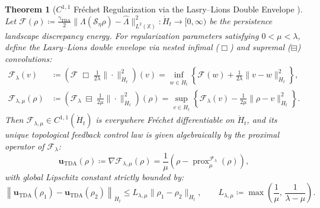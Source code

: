 \documentclass[11pt,a4paper,reqno]{article}
\theoremstyle{plain}
\newtheorem{theorem}{Theorem}[section]
\theoremstyle{definition}
\theoremstyle{remark}
\numberwithin{equation}{section}
\begin{document}
\begin{theorem}[$C^{1,1}$ Fr\'echet Regularization via the Lasry--Lions Double Envelope \cite{lasry1986remarks, attouch1993approximation, ananda2026stochastic_fluid_v2}]\label{thm:lasry_lions}
Let $\mathcal{F}(\rho) \coloneqq \frac{\gamma_{\mathrm{TDA}}}{2}\|\Lambda(\mathcal{S}_\eta\rho) - \hat{\Lambda}\|_{L^2(\mathbb{X})}^2 : \dot{H}_t \to [0, \infty)$ be the persistence landscape discrepancy energy. For regularization parameters satisfying $0 < \mu < \lambda$, define the Lasry--Lions double envelope via nested infimal ($\Box$) and supremal ($\boxminus$) convolutions:
\begin{align}
  \label{eq:lasry_lions_inf}
  \mathcal{F}_\lambda(v) &\coloneqq \left(\mathcal{F} \;\Box\; \frac{1}{2\lambda}\|\cdot\|_{\dot{H}_t}^2\right)(v) = \inf_{w \in \dot{H}_t} \left\{ \mathcal{F}(w) + \frac{1}{2\lambda}\|v - w\|_{\dot{H}_t}^2 \right\}, \\
  \label{eq:lasry_lions_def}
  \mathcal{F}_{\lambda,\mu}(\rho) &\coloneqq \left(\mathcal{F}_\lambda \;\boxminus\; \frac{1}{2\mu}\|\cdot\|_{\dot{H}_t}^2\right)(\rho) = \sup_{v \in \dot{H}_t} \left\{ \mathcal{F}_\lambda(v) - \frac{1}{2\mu}\|\rho - v\|_{\dot{H}_t}^2 \right\}.
\end{align}
Then $\mathcal{F}_{\lambda,\mu} \in C^{1,1}(\dot{H}_t)$ is everywhere Fr\'echet differentiable on $\dot{H}_t$, and its unique topological feedback control law is given algebraically by the proximal operator of $\mathcal{F}_\lambda$:
\begin{equation}\label{eq:lasry_lions_grad}
  \mathbf{u}_{\mathrm{TDA}}(\rho) \coloneqq \nabla \mathcal{F}_{\lambda,\mu}(\rho) = \frac{1}{\mu}\left( \rho - \operatorname{prox}_{\mu}^{\mathcal{F}_\lambda}(\rho) \right),
\end{equation}
with global Lipschitz constant strictly bounded by:
\begin{equation}\label{eq:lasry_lipschitz_bound}
  \left\| \mathbf{u}_{\mathrm{TDA}}(\rho_1) - \mathbf{u}_{\mathrm{TDA}}(\rho_2) \right\|_{\dot{H}_t} \le L_{\lambda,\mu} \|\rho_1 - \rho_2\|_{\dot{H}_t}, \qquad L_{\lambda,\mu} \coloneqq \max\!\left(\frac{1}{\mu},\, \frac{1}{\lambda - \mu}\right).
\end{equation}
\end{theorem}

\end{document}
